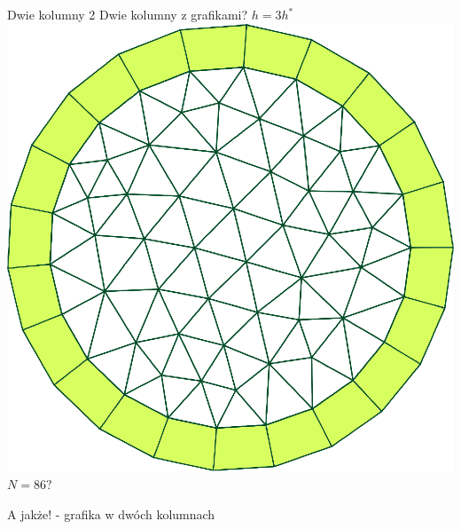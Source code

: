 \documentclass[
  size=14pt,
  mode=present,
  paper=a4paper,
  clock,
  style=sailor
]{powerdot}			%
\begin{document}
\begin{slide}{Dwie kolumny 2}
	Dwie kolumny z grafikami?
	{\centering $h=3h^*$
		\includegraphics[width=1.0\linewidth]
		{fig_onsolving3d_penny_mesh_2.eps}
	$N=86?$}
	

A jakże! - grafika w dwóch kolumnach
\end{slide}	
\end{document}

